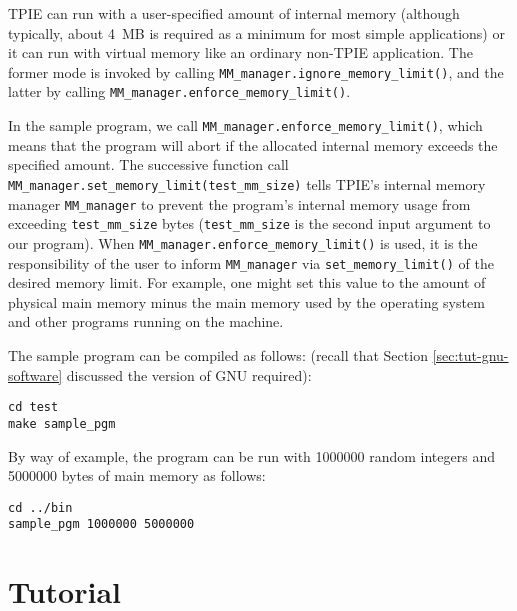TPIE can run with a user-specified amount of internal memory (although
typically, about 4~MB is required as a minimum for most simple
applications) or it can run with virtual memory like an ordinary
non-TPIE application. The former mode is invoked by calling
\lstinline|MM_manager.ignore_memory_limit()|, and the latter by
calling \lstinline|MM_manager.enforce_memory_limit()|.

In the sample program, we call
\lstinline|MM_manager.enforce_memory_limit()|, which means that the
program will abort if the allocated internal memory exceeds the
specified amount. The successive function call
\lstinline|MM_manager.set_memory_limit(test_mm_size)| tells TPIE's
internal memory manager \lstinline|MM_manager| to prevent the
program's internal memory usage from exceeding
\lstinline|test_mm_size| bytes (\lstinline|test_mm_size| is the second
input argument to our program). When
\lstinline|MM_manager.enforce_memory_limit()| is used, it is the
responsibility of the user to inform \lstinline|MM_manager| via
\lstinline|set_memory_limit()| of the desired memory limit.  For
example, one might set this value to the amount of physical main
memory minus the main memory used by the operating system and other
programs running on the machine.


The sample program can be compiled as follows: (recall that Section
\ref{sec:tut-gnu-software} discussed the version of GNU \CPP{}
required):

\begin{lstlisting}
cd test
make sample_pgm
\end{lstlisting}

By way of example, the program can be run with 1000000 random integers
and 5000000 bytes of main memory as follows:
\begin{lstlisting}
cd ../bin
sample_pgm 1000000 5000000
\end{lstlisting}


\chapter{Tutorial}

